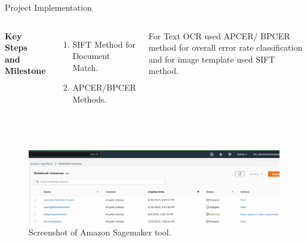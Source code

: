 \documentclass[aspectratio=169,xcolor=dvipsnames]{beamer}
\begin{document}

\begin{frame}{Project Implementation}
    \tableofcontents
    \begin{columns}[c] %

        \textbf{Key Steps and Milestone}
        \begin{enumerate}
            \item SIFT Method for Document Match.
            \item APCER/BPCER Methods.
        
        \end{enumerate}

         For Text OCR used APCER/ BPCER method for overall error rate classification and for image template used SIFT method.

    \end{columns}   \\

  \begin{figure}
   \includegraphics[width=420]{tool.jpg}
      \caption{Screenshot of Amazon Sagemaker tool.}
\end{figure}

\end{frame}
\end{document}

